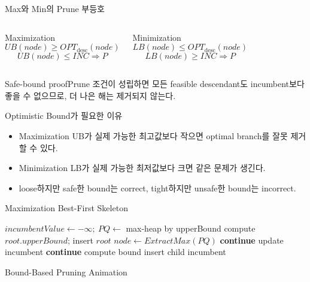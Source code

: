 \begin{frame}{Max와 Min의 Prune 부등호}
\begin{columns}
\begin{block}{Maximization}
\[
UB(node)\ge OPT_{\mathrm{desc}}(node)
\]
\[
UB(node)\le INC\Rightarrow P
\]
\end{block}
\begin{block}{Minimization}
\[
LB(node)\le OPT_{\mathrm{desc}}(node)
\]
\[
LB(node)\ge INC\Rightarrow P
\]
\end{block}
\end{columns}
\begin{exampleblock}{Safe-bound proof}Prune 조건이 성립하면 모든 feasible descendant도 incumbent보다 좋을 수 없으므로, 더 나은 해는 제거되지 않는다.\end{exampleblock}
\end{frame}
\begin{frame}{Optimistic Bound가 필요한 이유}
\begin{itemize}
\item Maximization UB가 실제 가능한 최고값보다 작으면 optimal branch를 잘못 제거할 수 있다.
\item Minimization LB가 실제 가능한 최저값보다 크면 같은 문제가 생긴다.
\item loose하지만 safe한 bound는 correct, tight하지만 unsafe한 bound는 incorrect.
\end{itemize}
\end{frame}
\begin{frame}{Maximization Best-First Skeleton}
\tiny\begin{algorithmic}[1]
\State \(incumbentValue\gets-\infty;\ PQ\gets\) max-heap by upperBound
\State compute \(root.upperBound\); insert \(root\)
\State \(node\gets ExtractMax(PQ)\)
\State\textbf{continue}\EndIf
{}
\State update incumbent
\EndIf
{}\State\textbf{continue}\EndIf
{}
\State compute bound
\State insert child\EndIf\EndIf
\EndFor
\EndWhile
\State\Return incumbent
\EndProcedure
\end{algorithmic}
\end{frame}
\begin{frame}{Bound-Based Pruning Animation}
\centering{}
\end{frame}
